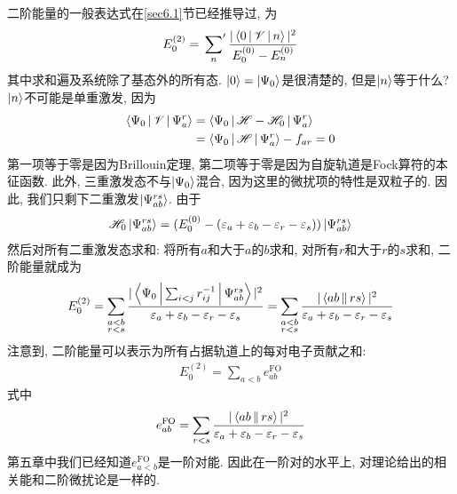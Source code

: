 二阶能量的一般表达式在\autoref{sec6.1}节已经推导过, 
为
\begin{align}
E_0^{(2)} = \sideset{}{'}\sum_n\frac{|\Braket{0|\mathscr{V}|n}|^2}{E_0^{(0)} - E_n^{(0)}}
\end{align}
其中求和遍及系统除了基态外的所有态. 
$\Ket{0} = \Ket{\Psi_0}$是很清楚的, 
但是$\Ket{n}$等于什么? $\Ket{n}$不可能是单重激发, 
因为
\begin{align*}
\Braket{\Psi_0|\mathscr{V}|\Psi_a^r} & = \Braket{\Psi_0|\mathscr{H}-\mathscr{H}_0|\Psi_a^r} \\
                             & = \Braket{\Psi_0|\mathscr{H}|\Psi_a^r} - f_{ar} = 0
\end{align*}
第一项等于零是因为Brillouin定理, 
第二项等于零是因为自旋轨道是Fock算符的本征函数. 
此外, 
三重激发态不与$\Ket{\Psi_0}$混合, 
因为这里的微扰项的特性是双粒子的. 
因此, 
我们只剩下二重激发$\Ket{\Psi_{ab}^{rs}}$. 
由于
\begin{align*}
\mathscr{H}_0\Ket{\Psi_{ab}^{rs}} = (E_0^{(0)} - (\varepsilon_a + \varepsilon_b - \varepsilon_r - \varepsilon_s))\Ket{\Psi_{ab}^{rs}}
\end{align*}
然后对所有二重激发态求和: 将所有$a$和大于$a$的$b$求和, 
对所有$r$和大于$r$的$s$求和, 
二阶能量就成为
\begin{align}
E_0^{(2)} = \sum_{\substack{a<b\\r<s}} \frac{|\Braket{\Psi_0|\sum_{i<j} r_{ij}^{-1}|\Psi_{ab}^{rs}}|^2}{\varepsilon_a + \varepsilon_b -\varepsilon_r-\varepsilon_s} = \sum_{\substack{a<b\\r<s}} \frac{|\Braket{ab||rs}|^2}{\varepsilon_a + \varepsilon_b -\varepsilon_r-\varepsilon_s}
\end{align}
注意到, 
二阶能量可以表示为所有占据轨道上的每对电子贡献之和:
\begin{align*}
E_0^{(2)} = \sum_{a<b}e_{ab}^\mathrm{FO}
\end{align*}
式中
\begin{align*}
e_{ab}^{\mathrm{FO}} =  \sum_{r<s} \frac{|\Braket{ab||rs}|^2}{\varepsilon_a + \varepsilon_b -\varepsilon_r-\varepsilon_s}
\end{align*}
第五章中我们已经知道$e_{a<b}^\mathrm{FO}$是一阶对能. 
因此在一阶对的水平上, 
对理论给出的相关能和二阶微扰论是一样的.


